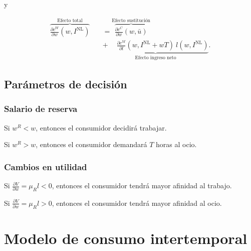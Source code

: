 \documentclass[8pt,a4paper]{extarticle}
\begin{document}
\begin{multicols}{3}
\begin{boxtheo}
	y
	
	\begin{equation*}
	\begin{aligned}
		\overbrace{\frac{\partial c^W}{\partial w} (w, I^{\text{NL}})}^{\text{Efecto total}} \quad &= \overbrace{\frac{\partial c^C}{\partial w} (w, \bar{u})}^{\text{Efecto sustitución}} \\
																						   & \underbrace{ + \quad\ \frac{\partial c^M}{\partial l} (w, I^{\text{NL}} + wT)\ l (w, I^{\text{NL}})}_{\text{Efecto ingreso neto}}.
	\end{aligned}
	\end{equation*}
\end{boxtheo}

\sectionbreak

\subsection{Parámetros de decisión}

\subsubsection*{Salario de reserva}

\begin{eqlist}
\item Si $ w^R < w $, entonces el consumidor decidirá trabajar.
\item Si $ w^R > w $, entonces el consumidor demandará $T$ horas al ocio.
\end{eqlist}

\subsubsection*{Cambios en utilidad}

\begin{eqlist}
\item Si $\displaystyle \frac{\partial V}{\partial w} = \mu_R l < 0$, entonces el consumidor tendrá mayor afinidad al trabajo.
\item Si $\displaystyle \frac{\partial V}{\partial w} = \mu_R l > 0$, entonces el consumidor tendrá mayor afinidad al ocio.
\end{eqlist}

\newpage

\section{Modelo de consumo intertemporal}


\end{multicols}
\end{document}
